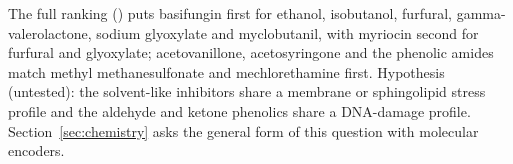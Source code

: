 The full ranking () puts basifungin first for
ethanol, isobutanol, furfural, gamma-valerolactone, sodium glyoxylate and myclobutanil,
with myriocin second for furfural and glyoxylate; acetovanillone, acetosyringone and
the phenolic amides match methyl methanesulfonate and mechlorethamine first. Hypothesis
(untested): the solvent-like inhibitors share a membrane or sphingolipid stress profile
and the aldehyde and ketone phenolics share a DNA-damage profile. Section~\ref{sec:chemistry}
asks the general form of this question with molecular encoders.
